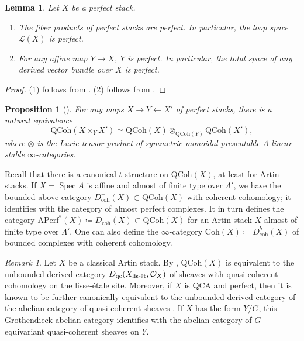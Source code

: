 \documentclass{amsart}
\newtheorem{lemma}[theorem]{Lemma}
\newtheorem{proposition}[theorem]{Proposition}
\theoremstyle{definition}
\theoremstyle{remark}
\newtheorem{remark}[theorem]{Remark}
\numberwithin{equation}{section}
\DeclareMathOperator{\Spec}{Spec}
\newcommand{\mc}{\mathcal}
\newcommand{\QCoh}{\mathrm{QCoh}}
\newcommand{\Coh}{\mathrm{Coh}}
\newcommand{\coh}{\mathrm{coh}}
\newcommand{\qc}{\mathrm{qc}}
\newcommand{\Aperf}{\mathrm{APerf}}
\begin{document}
\begin{lemma}
Let $X$ be a perfect stack. 
\begin{enumerate}
    \item The fiber products of perfect stacks are perfect. In particular, the loop space $\mc L(X)$ is perfect. 
    \item For any affine map $Y\to X$, $Y$ is perfect. In particular, the total space of any derived vector bundle over $X$ is perfect.  
\end{enumerate}
\end{lemma}

\begin{proof}
(1) follows from \cite[Proposition 3.24]{BenZviFrancisNadler}. (2) follows from \cite[Proposition 3.21]{BenZviFrancisNadler}. 
\end{proof}

\begin{proposition}[{\cite[Theorem 1.2]{BenZviFrancisNadler}}]\label{prop:QCoh_satisfies_Kunneth}
For any maps $X\to Y\leftarrow X'$ of perfect stacks, there is a natural equivalence
\[
\QCoh(X\times_Y X') \simeq \QCoh(X)\otimes_{\QCoh(Y)}\QCoh(X'), 
\]
where $\otimes$ is the Lurie tensor product of symmetric monoidal presentable $\Lambda$-linear stable $\infty$-categories. 
\end{proposition}

Recall that there is a canonical $t$-structure on $\QCoh(X)$, at least for Artin stacks. If $X=\Spec A$ is affine and almost of finite type over $\Lambda'$, we have the bounded above category $D_{\coh}^{-}(X)\subset \QCoh(X)$ with coherent cohomology; it identifies with the category of almost perfect complexes. It in turn defines the category $\Aperf^*(X)\coloneq D_{\coh}^{-}(X)\subset \QCoh(X)$ for an Artin stack $X$ almost of finite type over $\Lambda'$. One can also define the $\infty$-category $\Coh(X)\coloneq D_{\coh}^{b}(X)$ of bounded complexes with coherent cohomology. 

\begin{remark}
Let $X$ be a classical Artin stack. By \cite[Proposition 1.3]{HallRydh}, $\QCoh(X)$ is equivalent to the unbounded derived category $D_{\qc}(X_{\textnormal{lis-\'et}}, \mc O_X)$ of sheaves with quasi-coherent cohomology on the lisse-\'etale site. Moreover, if $X$ is QCA and perfect, then it is known to be further canonically equivalent to the unbounded derived category of the abelian category of quasi-coherent sheaves \cite[Theorem 1.2]{HallNeemanRydh}. If $X$ has the form $Y/G$, this Grothendieck abelian category identifies with the abelian category of $G$-equivariant quasi-coherent sheaves on $Y$. 
\end{remark}
\end{document}
